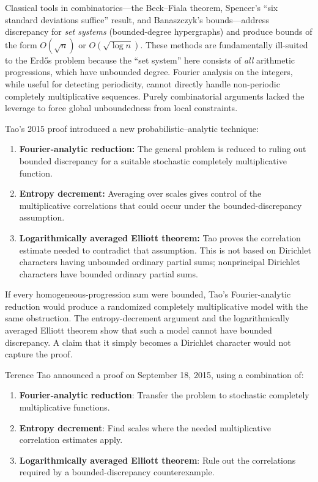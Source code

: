 Classical tools in combinatorics---the Beck--Fiala theorem, Spencer's ``six standard deviations suffice'' result, and Banaszczyk's bounds---address discrepancy for \emph{set systems} (bounded-degree hypergraphs) and produce bounds of the form $O(\sqrt{n})$ or $O(\sqrt{\log n})$. These methods are fundamentally ill-suited to the Erd\H{o}s problem because the ``set system'' here consists of \emph{all} arithmetic progressions, which have unbounded degree. Fourier analysis on the integers, while useful for detecting periodicity, cannot directly handle non-periodic completely multiplicative sequences. Purely combinatorial arguments lacked the leverage to force global unboundedness from local constraints.

Tao's 2015 proof introduced a new probabilistic--analytic technique:
\begin{enumerate}
\item \textbf{Fourier-analytic reduction:} The general problem is reduced to ruling out bounded discrepancy for a suitable stochastic completely multiplicative function.
\item \textbf{Entropy decrement:} Averaging over scales gives control of the multiplicative correlations that could occur under the bounded-discrepancy assumption.
\item \textbf{Logarithmically averaged Elliott theorem:} Tao proves the correlation estimate needed to contradict that assumption. This is not based on Dirichlet characters having unbounded ordinary partial sums; nonprincipal Dirichlet characters have bounded ordinary partial sums.
\end{enumerate}

If every homogeneous-progression sum were bounded, Tao's Fourier-analytic reduction would produce a randomized completely multiplicative model with the same obstruction. The entropy-decrement argument and the logarithmically averaged Elliott theorem show that such a model cannot have bounded discrepancy. A claim that it simply becomes a Dirichlet character would not capture the proof.

\bigskip

Terence Tao announced a proof on September 18, 2015, using a combination of:

\begin{enumerate}
\item \textbf{Fourier-analytic reduction}: Transfer the problem to stochastic completely multiplicative functions.
\item \textbf{Entropy decrement}: Find scales where the needed multiplicative correlation estimates apply.
\item \textbf{Logarithmically averaged Elliott theorem}: Rule out the correlations required by a bounded-discrepancy counterexample.
\end{enumerate}

